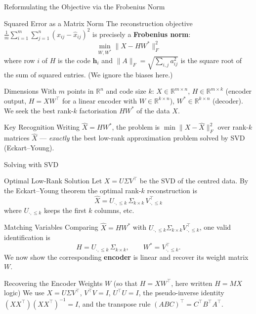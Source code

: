 \documentclass{beamer}
\begin{document}
\begin{frame}[shrink=10]{Reformulating the Objective via the Frobenius Norm}
  \begin{block}{Squared Error as a Matrix Norm}
    The reconstruction objective
    $\frac{1}{m}\sum_{i=1}^m\sum_{j=1}^n (x_{ij}-\hat{x}_{ij})^2$
    is precisely a \textbf{Frobenius norm}:
    \[
      \min_{W,W^{*}}
        \bigl\| X - H W^{*} \bigr\|_F^{2}
    \]
    where row $i$ of $H$ is the code $\mathbf{h}_i$ and
    $\|A\|_F = \sqrt{\sum_{i,j} a_{ij}^2}$ is the square root of the sum of
    squared entries. (We ignore the biases here.)
  \end{block}

  \begin{block}{Dimensions}
    With $m$ points in $\mathbb{R}^n$ and code size $k$:
    $X \in \mathbb{R}^{m\times n}$,\;
    $H \in \mathbb{R}^{m\times k}$ (encoder output, $H = XW^{\top}$ for a
    linear encoder with $W\in\mathbb{R}^{k\times n}$),\;
    $W^{*} \in \mathbb{R}^{k\times n}$ (decoder).
    We seek the best rank-$k$ factorisation $HW^{*}$ of the data $X$.
  \end{block}

  \begin{alertblock}{Key Recognition}
    Writing $\hat{X} = HW^{*}$, the problem is
    $\min \|X - \hat{X}\|_F^2$ over rank-$k$ matrices $\hat{X}$ ---
    \emph{exactly} the best low-rank approximation problem solved by SVD
    (Eckart--Young).
  \end{alertblock}
\end{frame}

\begin{frame}[shrink=10]{Solving with SVD}
  \begin{block}{Optimal Low-Rank Solution}
    Let $X = U\Sigma V^{\top}$ be the SVD of the centred data. By the
    Eckart--Young theorem the optimal rank-$k$ reconstruction is
    \[
      \hat{X} = U_{\cdot,\le k}\,\Sigma_{k\times k}\,V_{\cdot,\le k}^{\top}
    \]
    where $U_{\cdot,\le k}$ keeps the first $k$ columns, etc.
  \end{block}

  \begin{block}{Matching Variables}
    Comparing $\hat{X}=HW^{*}$ with $U_{\cdot,\le k}\Sigma_{k\times k}V_{\cdot,\le k}^{\top}$,
    one valid identification is
    \[
      H = U_{\cdot,\le k}\,\Sigma_{k\times k},
      \qquad
      W^{*} = V_{\cdot,\le k}^{\top}.
    \]
    We now show the corresponding \textbf{encoder} is linear and recover
    its weight matrix $W$.
  \end{block}

  \begin{block}{Recovering the Encoder Weights $W$ (so that $H = XW^{\top}$, here written $H = MX$ logic)}
    We use $X = U\Sigma V^{\top}$, $V^{\top}V = I$, $U^{\top}U = I$, the
    pseudo-inverse identity $(XX^{\top})(XX^{\top})^{-1} = I$, and the
    transpose rule $(ABC)^{\top} = C^{\top}B^{\top}A^{\top}$.
  \end{block}
\end{frame}
\end{document}
